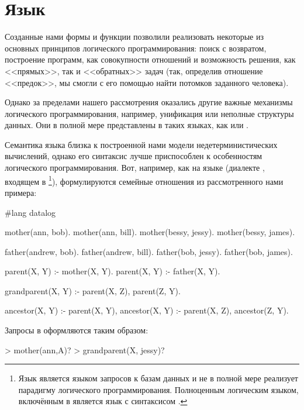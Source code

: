 \section[2]{Язык }%
Созданные нами формы и функции позволили реализовать некоторые из основных принципов логического программирования: поиск с возвратом, построение программ, как совокупности отношений и возможность решения, как <<прямых>>, так и <<обратных>> задач (так, определив отношение <<предок>>, мы смогли с его помощью найти потомков заданного человека). 

Однако за пределами нашего рассмотрения оказались другие важные механизмы логического программирования, например, унификация или неполные структуры данных. Они в полной мере представлены в таких языках, как  или .


Семантика языка  близка к построенной нами модели недетерминистических вычислений, однако его синтаксис лучше приспособлен к особенностям логического программирования. Вот, например, как на языке  (диалекте , входящем в \footnote{Язык  является языком запросов к базам данных и не в полной мере реализует парадигму логического программирования. Полноценным логическим языком, включённым в  является язык  с синтаксисом \Scheme.}), формулируются семейные отношения из рассмотренного нами примера:

\newpage
\begin{Definition}
  #lang datalog

  mother(ann, bob).
  mother(ann, bill).
  mother(bessy, jessy).
  mother(bessy, james).

  father(andrew, bob).
  father(andrew, bill).
  father(bob, jessy).
  father(bob, james).

  parent(X, Y) :- mother(X, Y).
  parent(X, Y) :- father(X, Y).

  grandparent(X, Y) :- parent(X, Z), parent(Z, Y).

  ancestor(X, Y) :- parent(X, Y),
  ancestor(X, Y) :- parent(X, Z), ancestor(Z, Y).
\end{Definition}

Запросы в  оформляются таким образом:

\begin{SchemeCode}
  > mother(ann,A)?
  > grandparent(X, jessy)?
\end{SchemeCode}


